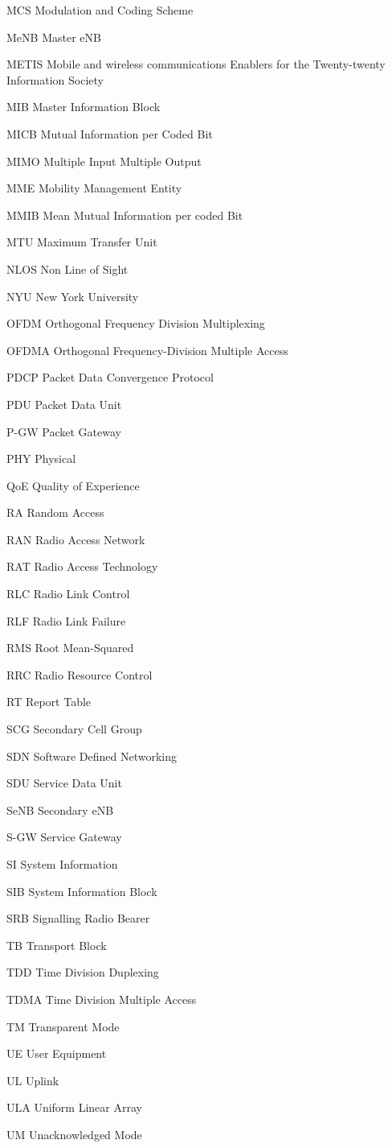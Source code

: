 \begin{abbreviations}
\item[MCS] Modulation and Coding Scheme
\item[MeNB] Master eNB
\item[METIS] Mobile and wireless communications Enablers for the Twenty-twenty Information Society
\item[MIB] Master Information Block
\item[MICB] Mutual Information per Coded Bit
\item[MIMO] Multiple Input Multiple Output
\item[MME] Mobility Management Entity
\item[MMIB] Mean Mutual Information per coded Bit
\item[MTU] Maximum Transfer Unit
\item[NLOS] Non Line of Sight
\item[NYU] New York University
\item[OFDM] Orthogonal Frequency Division Multiplexing 
\item[OFDMA] Orthogonal Frequency-Division Multiple Access
\item[PDCP] Packet Data Convergence Protocol
\item[PDU] Packet Data Unit
\item[P-GW] Packet Gateway
\item[PHY] Physical
\item[QoE] Quality of Experience
\item[RA] Random Access
\item[RAN] Radio Access Network
\item[RAT] Radio Access Technology
\item[RLC] Radio Link Control
\item[RLF] Radio Link Failure
\item[RMS] Root Mean-Squared
\item[RRC] Radio Resource Control
\item[RT] Report Table
\item[SCG] Secondary Cell Group
\item[SDN] Software Defined Networking
\item[SDU] Service Data Unit
\item[SeNB] Secondary eNB
\item[S-GW] Service Gateway
\item[SI] System Information
\item[SIB] System Information Block
\item[SRB] Signalling Radio Bearer
\item[TB] Transport Block
\item[TDD] Time Division Duplexing 
\item[TDMA] Time Division Multiple Access
\item[TM] Transparent Mode
\item[UE] User Equipment
\item[UL] Uplink
\item[ULA] Uniform Linear Array
\item[UM] Unacknowledged Mode

\end{abbreviations}
